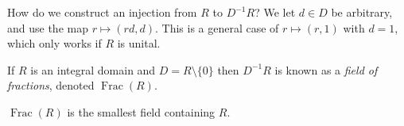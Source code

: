 How do we construct an injection from $R$ to $D^{-1}R$? We let $d \in D$ be arbitrary, and use the map $r \mapsto (rd,d)$. This is a general case of $r \mapsto (r,1)$ with $d = 1$, which only works if $R$ is unital.

\begin{definition}
If $R$ is an integral domain and $D = R \setminus \{0\}$ then $D^{-1}R$ is known as a \emph{field of fractions}, denoted $\operatorname{Frac}(R)$.
\end{definition}

\begin{corollary}
$\operatorname{Frac}(R)$ is the smallest field containing $R$.
\end{corollary}

\begin{example}
\end{example}